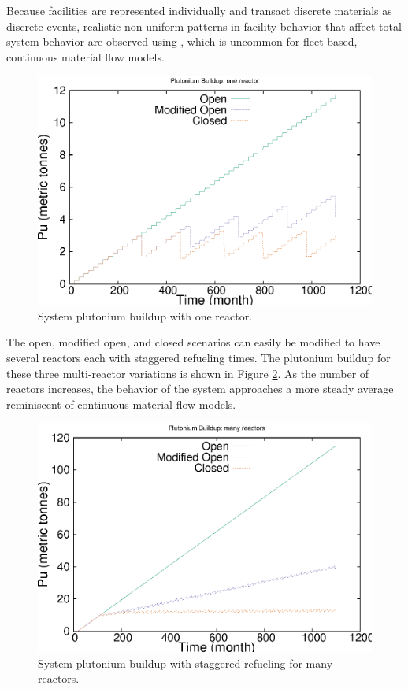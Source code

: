 Because facilities are represented individually and
transact discrete materials as discrete events, realistic non-uniform patterns in facility behavior
that affect total system behavior are observed using \Cyclus, which is uncommon 
for fleet-based, continuous material flow models.

\begin{figure}[H]
\caption{System plutonium buildup with one reactor.}
\begin{center}
\includegraphics{./images/puseries-1.eps}
\end{center}
\label{fig:puseries1}
\end{figure}

The open, modified open, and closed scenarios can easily be modified to have
several reactors each with staggered refueling times. The plutonium buildup
for these three multi-reactor variations is shown in Figure
\ref{fig:puseriesn}. As the number of
reactors increases, the behavior of the system approaches a more steady
average reminiscent of continuous material flow models. 

\begin{figure}[H]
\caption{System plutonium buildup with staggered refueling for many reactors.}
\begin{center}
\includegraphics{./images/puseries-n.eps}
\end{center}
\label{fig:puseriesn}
\end{figure}


